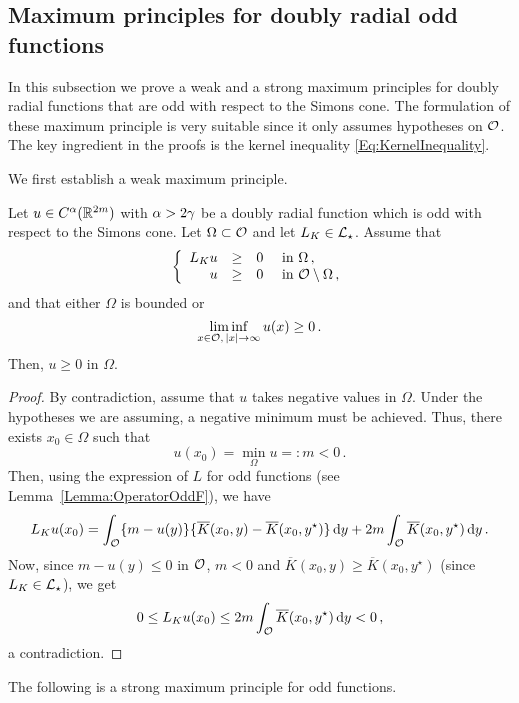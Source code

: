 \subsection{Maximum principles for doubly radial odd functions}

In this subsection we prove a weak and a strong maximum principles for doubly radial functions that are odd with respect to the Simons cone. The formulation of these maximum principle is very suitable since it only assumes hypotheses on $\mathcal{O}$. The key ingredient in the proofs is the kernel inequality \eqref{Eq:KernelInequality}.


We first establish a weak maximum principle.

\begin{proposition}
\label{Prop:WeakMaximumPrincipleForOddFunctions} Let $u\in C^{\alpha}(\mathbb{R}^{2m})$ with $\alpha > 2\gamma$ be a doubly radial function which is odd with respect to the Simons cone. Let $\Omega \subset \mathcal{O}$ and let $L_K  \in \mathcal{L}_\star$. Assume that
$$
\left\{\begin{array}{rcll}
L_K u & \geq & 0 & \text{ in } \Omega\,,\\
u & \geq & 0 & \text{ in } \mathcal{O} \setminus \Omega\,,
\end{array} \right.
$$
and that either $\Omega$ is bounded or 
$$
\liminf_{x \in \mathcal{O},\,|x|\to \infty} u(x) \geq 0\,.
$$
Then, $u \geq 0$ in $\Omega$.
\end{proposition}

\begin{proof}
By contradiction, assume that $u$ takes negative values in $\Omega$. Under the hypotheses we are assuming, a negative minimum must be achieved. Thus, there exists $x_0\in \Omega$ such that
$$
u(x_0) = \min_{\Omega} u =: m < 0\,.
$$
Then, using the expression of $L$ for odd functions (see Lemma~\ref{Lemma:OperatorOddF}), we have
$$
L_K u (x_0) = \int_{\mathcal{O}} \{m - u(y) \} \{\overline{K}(x_0, y) - \overline{K}(x_0, y^\star)  \} \,\mathrm{d} y +  2 m \int_{\mathcal{O}} \overline{K}(x_0, y^\star) \,\mathrm{d} y\,.
$$
Now, since $m - u(y) \leq 0$ in $\mathcal{O}$, $m<0$ and $\overline{K}(x_0, y) \geq \overline{K}(x_0, y^\star)$ (since $L_K\in \mathcal{L}_\star$), we get
$$
0 \leq L_K  u(x_0) \leq 2m \int_{\mathcal{O}} \overline{K}(x_0, y^\star) \,\mathrm{d} y < 0\,,
$$
a contradiction.
\end{proof}

The following is a strong maximum principle for odd functions.

